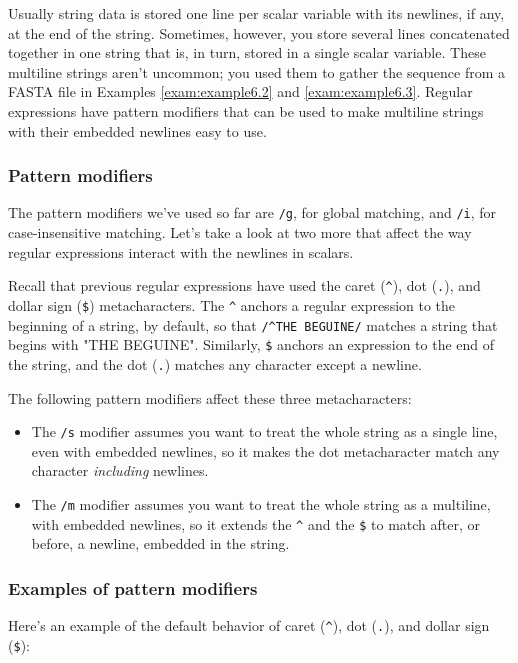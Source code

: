 Usually string data is stored one line per scalar variable with its newlines, if any, at the end of the string. Sometimes, however, you store several lines concatenated together in one string that is, in turn, stored in a single scalar variable. These multiline strings aren't uncommon; you used them to gather the sequence from a FASTA file in Examples \autoref{exam:example6.2} and \autoref{exam:example6.3}. Regular expressions have pattern modifiers that can be used to make multiline strings with their embedded newlines easy to use. 

\subsubsection{Pattern modifiers}
The pattern modifiers we've used so far are \verb|/g|, for global matching, and \verb|/i|, for case-insensitive matching. Let's take a look at two more that affect the way regular expressions interact with the newlines in scalars.

Recall that previous regular expressions have used the caret (\verb|^|), dot (\verb|.|), and dollar sign (\verb|$|) metacharacters. The \verb|^| anchors a regular expression to the beginning of a string, by default, so that \verb|/^THE BEGUINE/| matches a string that begins with "THE BEGUINE". Similarly, \verb|$| anchors an expression to the end of the string, and the dot (\verb|.|) matches any character except a newline.

The following pattern modifiers affect these three metacharacters:

\begin{itemize}
  \item The \verb|/s| modifier assumes you want to treat the whole string as a single line, even with embedded newlines, so it makes the dot metacharacter match any character \textit{including} newlines.  
  \item The \verb|/m| modifier assumes you want to treat the whole string as a multiline, with embedded newlines, so it extends the \verb|^| and the \verb|$| to match after, or before, a newline, embedded in the string.
\end{itemize}

\subsubsection{Examples of pattern modifiers}
Here's an example of the default behavior of caret (\verb|^|), dot (\verb|.|), and dollar sign (\verb|$|): 

